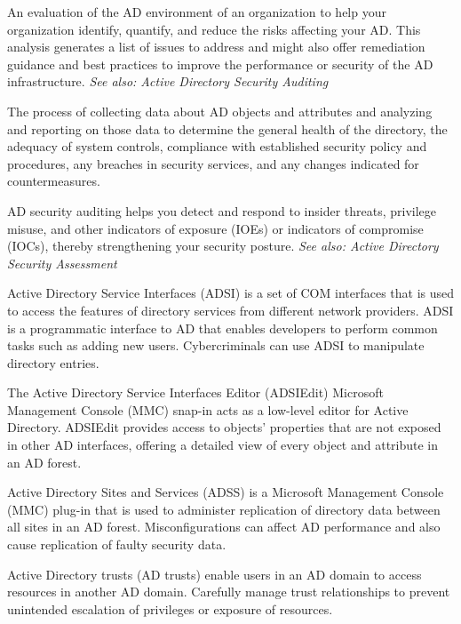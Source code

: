  An evaluation of the AD environment of an organization to help your organization identify, quantify, and reduce the risks affecting your AD. This analysis generates a list of issues to address and might also offer remediation guidance and best practices to improve the performance or security of the AD infrastructure.
\textit{See also: Active Directory Security Auditing}

 The process of collecting data about AD objects and attributes and analyzing and reporting on those data to determine the general health of the directory, the adequacy of system controls, compliance with established security policy and procedures, any breaches in security services, and any changes indicated for countermeasures.

AD security auditing helps you detect and respond to insider threats, privilege misuse, and other indicators of exposure (IOEs) or indicators of compromise (IOCs), thereby strengthening your security posture.
\textit{See also: Active Directory Security Assessment}

 Active Directory Service Interfaces (ADSI) is a set of COM interfaces that is used to access the features of directory services from different network providers. ADSI is a programmatic interface to AD that enables developers to perform common tasks such as adding new users. Cybercriminals can use ADSI to manipulate directory entries.

 The Active Directory Service Interfaces Editor (ADSIEdit) Microsoft Management Console (MMC) snap-in acts as a low-level editor for Active Directory. ADSIEdit provides access to objects’ properties that are not exposed in other AD interfaces, offering a detailed view of every object and attribute in an AD forest.

 Active Directory Sites and Services (ADSS) is a Microsoft Management Console (MMC) plug-in that is used to administer replication of directory data between all sites in an AD forest. Misconfigurations can affect AD performance and also cause replication of faulty security data.

 Active Directory trusts (AD trusts) enable users in an AD domain to access resources in another AD domain. Carefully manage trust relationships to prevent unintended escalation of privileges or exposure of resources.

